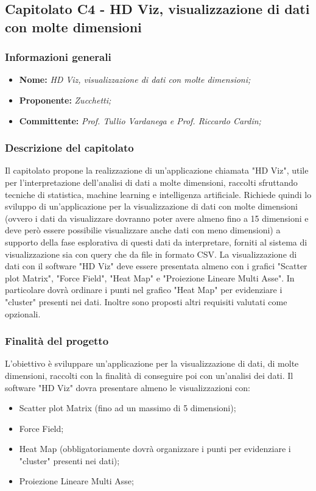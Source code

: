 \subsection{Capitolato C4 - HD Viz, visualizzazione di dati con molte dimensioni}
\subsubsection{Informazioni generali}
	\begin{itemize}
	\item \textbf{Nome:} \textit{HD Viz, visualizzazione di dati con molte dimensioni;}
	\item \textbf{Proponente:} \textit{Zucchetti;}
	\item \textbf{Committente:}  \textit{Prof. Tullio Vardanega e Prof. Riccardo Cardin;}
	\end{itemize}
\subsubsection{Descrizione del capitolato}
Il capitolato propone la realizzazione di un'applicazione chiamata "HD Viz", utile per l'interpretazione dell'analisi di dati a molte dimensioni, raccolti sfruttando tecniche di statistica, machine learning e intelligenza artificiale.
Richiede quindi lo sviluppo di un'applicazione per la visualizzazione di dati con molte dimensioni (ovvero i dati da visualizzare dovranno poter avere almeno fino a 15 dimensioni e deve però essere possibilie visualizzare anche dati con meno dimensioni) a supporto della fase esplorativa di questi dati da interpretare, forniti al sistema di visualizzazione sia con query che da file in formato CSV.
La visualizzazione di dati con il software "HD Viz" deve essere presentata almeno con i grafici "Scatter plot Matrix", "Force Field", "Heat Map" e "Proiezione Lineare Multi Asse". In particolare dovrà ordinare i punti nel grafico "Heat Map" per evidenziare i "cluster" presenti nei dati.
Inoltre sono proposti altri requisiti valutati come opzionali.
\subsubsection{Finalità del progetto}
L'obiettivo è sviluppare un'applicazione per la visualizzazione di dati, di molte dimensioni, raccolti con la finalità di conseguire poi con un'analisi dei dati.
Il software "HD Viz" dovra presentare almeno le visualizzazioni con:
\begin{itemize}
\item Scatter plot Matrix (fino ad un massimo di 5 dimensioni);
\item Force Field;
\item Heat Map (obbligatoriamente dovrà organizzare i punti per evidenziare i "cluster" presenti nei dati);
\item Proiezione Lineare Multi Asse;
\end{itemize}
